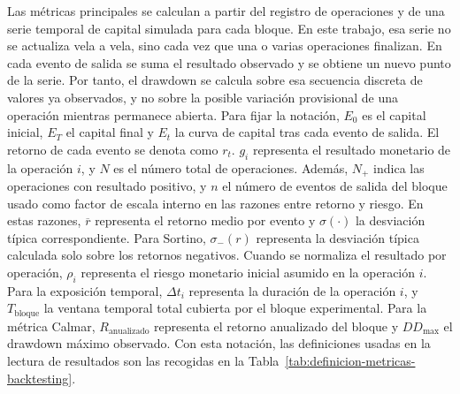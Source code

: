 Las m\'etricas principales se calculan a partir del registro de operaciones y
de una serie temporal de capital simulada para cada bloque. En este trabajo,
esa serie no se actualiza vela a vela, sino cada vez que una o varias
operaciones finalizan. En cada evento de salida se suma el resultado observado
y se obtiene un nuevo punto de la serie. Por tanto, el drawdown se calcula
sobre esa secuencia discreta de valores ya observados, y no sobre la posible
variaci\'on provisional de una operaci\'on mientras permanece abierta. Para fijar la notaci\'on, \(E_0\) es el capital
inicial, \(E_T\) el capital final y \(E_t\) la curva de capital tras cada
evento de salida. El retorno de cada evento se denota como \(r_t\).
\(g_i\) representa el resultado monetario de la operaci\'on \(i\), y \(N\) es el
n\'umero total de operaciones. Adem\'as, \(N_+\) indica las operaciones con resultado positivo, y
\(n\) el n\'umero de eventos de salida del bloque usado como factor de escala
interno en las razones entre retorno y riesgo.
En estas razones, \(\overline{r}\) representa el retorno medio por evento y
\(\sigma(\cdot)\) la desviaci\'on t\'ipica correspondiente.
Para Sortino, \(\sigma_-(r)\) representa la desviaci\'on t\'ipica calculada
solo sobre los retornos negativos.
Cuando se normaliza el resultado por operaci\'on, \(\rho_i\) representa el
riesgo monetario inicial asumido en la operaci\'on \(i\).
Para la exposici\'on temporal, \(\Delta t_i\) representa la duraci\'on de la
operaci\'on \(i\), y \(T_\text{bloque}\) la ventana temporal total cubierta por
el bloque experimental.
Para la m\'etrica Calmar, \(R_\text{anualizado}\) representa el retorno
anualizado del bloque y \(DD_\text{max}\) el drawdown m\'aximo observado. Con
esta notaci\'on, las definiciones usadas en la lectura de resultados son las
recogidas en la
Tabla~\ref{tab:definicion-metricas-backtesting}.

